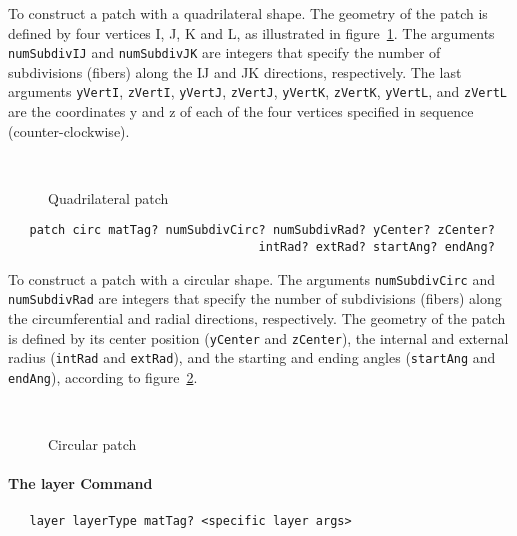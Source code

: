 \documentclass[12pt]{article}
\begin{document}
\noindent To construct a patch with a quadrilateral shape. The geometry of 
the patch is defined by four vertices I, J, K and L, as illustrated
in figure~\ref{quadPatch}.
The arguments {\tt numSubdivIJ} and {\tt numSubdivJK} are integers
that specify the number of subdivisions (fibers) along the IJ and JK 
directions, respectively. The last arguments {\tt yVertI}, {\tt zVertI},
{\tt yVertJ}, {\tt zVertJ}, {\tt yVertK}, {\tt zVertK}, {\tt yVertL}, and
{\tt zVertL} are the coordinates y and z of each of the four vertices
specified in sequence (counter-clockwise).
 

\begin{figure}[htpb]
\begin{center}
\leavevmode
\hbox{%
}
\end{center}
\caption{Quadrilateral patch}
\label{quadPatch}
\end{figure}


{\sf\small
\begin{verbatim}
   patch circ matTag? numSubdivCirc? numSubdivRad? yCenter? zCenter? 
                                   intRad? extRad? startAng? endAng?
\end{verbatim}
}

\noindent To construct a patch with a circular shape.
The arguments {\tt numSubdivCirc} and {\tt numSubdivRad} are integers
that specify the number of subdivisions (fibers) along the
circumferential and radial directions, respectively. 
The geometry of the patch is defined by its center position
({\tt yCenter} and {\tt zCenter}), the internal and external radius 
({\tt intRad} and {\tt extRad}), and the starting and ending angles
({\tt startAng} and {\tt endAng}), according to figure~\ref{circPatch}. 


\begin{figure}[htpb]
\begin{center}
\leavevmode
\hbox{%
}
\end{center}
\caption{Circular patch}
\label{circPatch}
\end{figure}

\paragraph{The layer Command}

{\sf\small
\begin{verbatim}
   layer layerType matTag? <specific layer args>
\end{verbatim}
}
\end{document}
